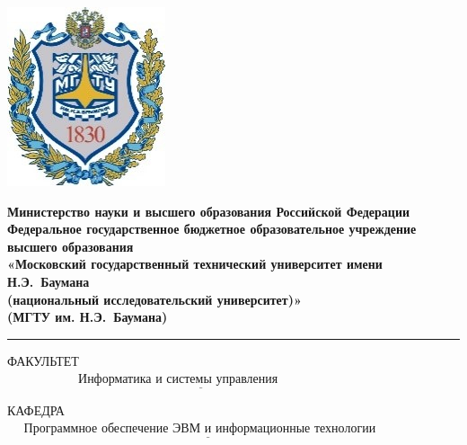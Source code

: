 \documentclass[12pt,a4paper,oneside]{report}
\begin{document}
	
\noindent \begin{minipage}{0.15\textwidth}
	\includegraphics[width=\linewidth]{b_logo}
\end{minipage}
\noindent\begin{minipage}{0.9\textwidth}\centering
	\textbf{Министерство науки и высшего образования Российской Федерации}\\
	\textbf{Федеральное государственное бюджетное образовательное учреждение высшего образования}\\
	\textbf{«Московский государственный технический университет имени Н.Э.~Баумана}\\
	\textbf{(национальный исследовательский университет)»}\\
	\textbf{(МГТУ им. Н.Э.~Баумана)}
\end{minipage}

\noindent\rule{18cm}{3pt}
\newline
\noindent ФАКУЛЬТЕТ $\underline{\text{~~~~~~~~~~~~~~~~~Информатика и системы управления~~~~~~~~~~~~~~~~~~~~~~~~~~~~}}$ \newline

\noindent КАФЕДРА $\underline{\text{~~~~Программное обеспечение ЭВМ и информационные технологии~~~~~~~~}}$\newline
\end{document}

